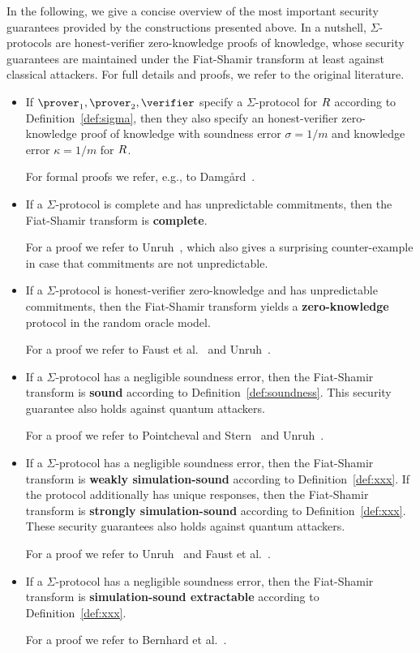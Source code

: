 \documentclass[runningheads]{llncs}
\begin{document}
In the following, we give a concise overview of the most important security guarantees provided by the constructions presented above.
In a nutshell, $\Sigma$-protocols are honest-verifier zero-knowledge proofs of knowledge, whose security guarantees are maintained under the Fiat-Shamir transform at least against classical attackers.
For full details and proofs, we refer to the original literature.
\begin{itemize}
  \item
    If $\prover_1,\prover_2,\verifier$ specify a $\Sigma$-protocol for $R$ according to Definition~\ref{def:sigma}, then they also specify an honest-verifier zero-knowledge proof of knowledge with soundness error $\sigma=1/m$ and knowledge error $\kappa=1/m$ for $R$.

For formal proofs we refer, e.g., to Damg\r{a}rd~\cite{damgard04}.
  \item
    If a $\Sigma$-protocol is complete and has unpredictable commitments, then the Fiat-Shamir transform is {\bf complete}.

    For a proof we refer to Unruh~\cite{AC:Unruh17}, which also gives a surprising counter-example in case that commitments are not unpredictable.
  \item
    If a $\Sigma$-protocol is honest-verifier zero-knowledge and has unpredictable commitments, then the Fiat-Shamir transform yields a {\bf zero-knowledge} protocol in the random oracle model.

    For a proof we refer to Faust et al.~\cite{INDOCRYPT:FKMV12} and Unruh~\cite{AC:Unruh17}.
  \item
    If a $\Sigma$-protocol has a negligible soundness error, then the Fiat-Shamir transform is {\bf sound} according to Definition~\ref{def:soundness}.
    This security guarantee also holds against quantum attackers.

    For a proof we refer to Pointcheval and Stern~\cite{JC:PoiSte00} and Unruh~\cite{AC:Unruh17}. 
  \item
    If a $\Sigma$-protocol has a negligible soundness error, then the Fiat-Shamir transform is {\bf weakly simulation-sound} according to Definition~\ref{def:xxx}.
    If the protocol additionally has unique responses, then the Fiat-Shamir transform is {\bf strongly simulation-sound} according to Definition~\ref{def:xxx}.
    These security guarantees also holds against quantum attackers.

    For a proof we refer to Unruh~\cite{AC:Unruh17} and Faust et al.~\cite{INDOCRYPT:FKMV12}. 
  \item
    If a $\Sigma$-protocol has a negligible soundness error, then the Fiat-Shamir transform is {\bf simulation-sound extractable} according to Definition~\ref{def:xxx}.

    For a proof we refer to Bernhard et al.~\cite{AC:BerPerWar12}. 
\end{itemize}
\end{document}
